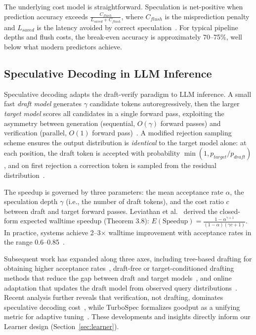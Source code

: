 \documentclass[conference,10pt]{IEEEtran}
\begin{document}
The underlying cost model is straightforward. Speculation is net-positive when prediction accuracy exceeds $\frac{C_{flush}}{L_{saved} + C_{flush}}$, where $C_{flush}$ is the misprediction penalty and $L_{saved}$ is the latency avoided by correct speculation~\cite{hennessy2017computer}.
For typical pipeline depths and flush costs, the break-even accuracy is approximately 70--75\%, well below what modern predictors achieve.

\subsection{Speculative Decoding in LLM Inference}

Speculative decoding adapts the draft-verify paradigm to LLM inference.
A small fast \emph{draft model} generates $\gamma$ candidate tokens autoregressively, then the larger \emph{target model} scores all candidates in a single forward pass, exploiting the asymmetry between generation (sequential, $O(\gamma)$ forward passes) and verification (parallel, $O(1)$ forward pass)~\cite{leviathan2023fast, chen2023accelerating}.
A modified rejection sampling scheme ensures the output distribution is \emph{identical} to the target model alone: at each position, the draft token is accepted with probability $\min(1, p_{target}/p_{draft})$, and on first rejection a correction token is sampled from the residual distribution~\cite{leviathan2023fast}.

The speedup is governed by three parameters: the mean acceptance rate $\alpha$, the speculation depth $\gamma$ (i.e., the number of draft tokens), and the cost ratio $c$ between draft and target forward passes. Leviathan et al.~\cite{leviathan2023fast} derived the closed-form expected walltime speedup (Theorem 3.8): $E(\text{Speedup}) = \frac{1 - \alpha^{\gamma+1}}{(1-\alpha)(\gamma c + 1)}$. In practice, systems achieve 2--3$\times$ walltime improvement with acceptance rates in the range 0.6--0.85~\cite{xia2024survey}.

Subsequent work has expanded along three axes, including tree-based drafting for obtaining higher acceptance rates~\cite{miao2024specinfer, chen2024sequoia}, draft-free or target-conditioned drafting methods that reduce the gap between draft and target models~\cite{cai2024medusa, li2024eagle, li2025eagle3}, and online adaptation that updates the draft model from observed query distributions~\cite{liu2024online}.
Recent analysis further reveals that verification, not drafting, dominates speculative decoding cost~\cite{liu2025verification}, while TurboSpec formalizes goodput as a unifying metric for adaptive tuning~\cite{liu2024turbospec}.
These developments and insights directly inform our Learner design (Section~\ref{sec:learner}).
\end{document}
